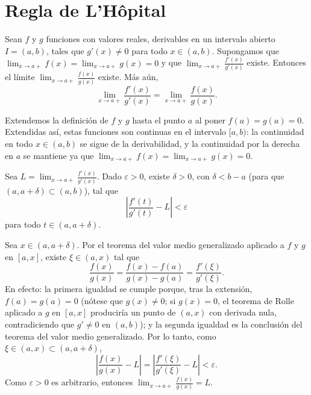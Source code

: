\section{Regla de L'Hôpital}

\begin{teorema}
Sean $f$ y $g$ funciones con valores reales, derivables en un intervalo abierto $I=(a,b)$, tales que $g'(x)\neq 0$ para todo $x\in(a,b)$. Supongamos que $\lim_{x\to a+} f(x)=\lim_{x\to a+} g(x)=0$ y que $\lim_{x\to a+}\frac{f'(x)}{g'(x)}$ existe. Entonces el límite $\lim_{x\to a+}\frac{f(x)}{g(x)}$ existe. Más aún,
\begin{equation}
\lim _{x\to a+}\frac{f'( x)}{g'( x)} =\lim _{x\to a+}\frac{f( x)}{g( x)}.
\end{equation}
\end{teorema}

\begin{prueba}
    Extendemos la definición de $f$ y $g$ hasta el punto $a$ al poner $f(a)=g(a)=0$. Extendidas así, estas funciones son continuas en el intervalo $[a,b)$: la continuidad en todo $x\in(a,b)$ se sigue de la derivabilidad, y la continuidad por la derecha en $a$ se mantiene ya que $\lim_{x\to a+} f(x)=\lim_{x\to a+} g(x)=0$.

    Sea $L=\lim_{x\to a+}\frac{f'(x)}{g'(x)}$. Dado $\varepsilon>0$, existe $\delta>0$, con $\delta < b-a$ (para que $(a,a+\delta)\subset(a,b)$), tal que
    \[
    \left| \frac{f'( t)}{g'( t)} -L\right| < \varepsilon
    \]
    para todo $t\in ( a,a+\delta )$.

    Sea $x\in(a,a+\delta)$. Por el teorema del valor medio generalizado aplicado a $f$ y $g$ en $[a,x]$, existe $\xi \in ( a,x)$ tal que
    \begin{equation}
    \frac{f( x)}{g( x)} =\frac{f( x) -f( a)}{g( x) -g( a)} =\frac{f'( \xi )}{g'( \xi )}.
    \end{equation}
    En efecto: la primera igualdad se cumple porque, tras la extensión, $f(a)=g(a)=0$ (nótese que $g(x)\neq 0$; si $g(x)=0$, el teorema de Rolle aplicado a $g$ en $[a,x]$ produciría un punto de $(a,x)$ con derivada nula, contradiciendo que $g'\neq 0$ en $(a,b)$); y la segunda igualdad es la conclusión del teorema del valor medio generalizado. Por lo tanto, como $\xi\in(a,x)\subset(a,a+\delta)$,
    \[
    \left| \frac{f( x)}{g( x)} -L\right| =\left| \frac{f'( \xi )}{g'( \xi )} -L\right| < \varepsilon.
    \]
    Como $\varepsilon>0$ es arbitrario, entonces $\lim_{x\to a+}\frac{f( x)}{g( x)} =L$.
\end{prueba}

